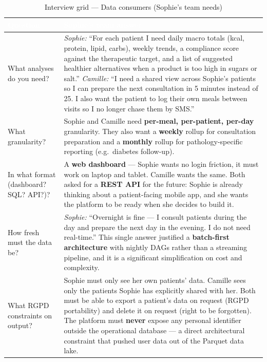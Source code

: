 \documentclass[a4paper,11pt,oneside,openany]{report}
\newcommand{\rgpd}{RGPD}
\begin{document}
\begin{table}[H]
\centering
\caption{Interview grid --- Data consumers (Sophie's team needs)}
\label{tab:grid-cons}
\begin{tabularx}{\textwidth}{L{4cm} X}
\toprule
{}
\textcolor{white}{\textbf{Question}} & \textcolor{white}{\textbf{Sophie's team answer}} \\
\midrule
What analyses do you need? &
\textit{Sophie:} ``For each patient I need daily macro totals
(kcal, protein, lipid, carbs), weekly trends, a compliance score
against the therapeutic target, and a list of suggested healthier
alternatives when a product is too high in sugars or salt.''
\textit{Camille:} ``I need a shared view across Sophie's patients
so I can prepare the next consultation in 5 minutes instead of
25. I also want the patient to log their own meals between visits
so I no longer chase them by SMS.''
\\
\addlinespace
What granularity? &
Sophie and Camille need \textbf{per-meal, per-patient, per-day}
granularity. They also want a \textbf{weekly} rollup for
consultation preparation and a \textbf{monthly} rollup for
pathology-specific reporting (e.g.\ diabetes follow-up).
\\
\addlinespace
In what format (dashboard?
SQL? API?)? &
A \textbf{web dashboard} --- Sophie wants no login friction, it
must work on laptop and tablet. Camille wants the same. Both
asked for a \textbf{REST API} for the future: Sophie is already
thinking about a patient-facing mobile app, and she wants the
platform to be ready when she decides to build it.
\\
\addlinespace
How fresh must the data be? &
\textit{Sophie:} ``Overnight is fine --- I consult patients during
the day and prepare the next day in the evening. I do not need
real-time.'' This single answer justified a \textbf{batch-first
architecture} with nightly DAGs rather than a streaming pipeline,
and it is a significant simplification on cost and complexity.
\\
\addlinespace
What \rgpd{} constraints on
output? &
Sophie must only see her own patients' data. Camille sees only
the patients Sophie has explicitly shared with her. Both must be
able to export a patient's data on request (\rgpd{} portability)
and delete it on request (right to be forgotten). The platform
must \textbf{never} expose any personal identifier outside the
operational database --- a direct architectural constraint that
pushed user data out of the Parquet data lake.

\end{tabularx}
\end{table}
\end{document}
